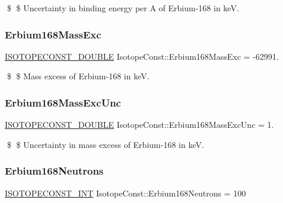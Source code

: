 \$ \$ Uncertainty in binding energy per A of Erbium-\/168 in keV. \mbox{\label{group___isotope_const-_erbium-_er168_gabd1a58198f4ecb49cb18844de8701a07}} 
\subsubsection{\texorpdfstring{Erbium168\+Mass\+Exc}{Erbium168MassExc}}
{\footnotesize\ttfamily \mbox{\hyperlink{group___isotope_const-_macros_ga8f45a7272ce02c0b4c65c44636ed719a}{I\+S\+O\+T\+O\+P\+E\+C\+O\+N\+S\+T\+\_\+\+D\+O\+U\+B\+LE}} Isotope\+Const\+::\+Erbium168\+Mass\+Exc = -\/62991.}

\$ \$ Mass excess of Erbium-\/168 in keV. \mbox{\label{group___isotope_const-_erbium-_er168_ga54f88c764cec3b32b38125db8c7d9d4e}} 
\subsubsection{\texorpdfstring{Erbium168\+Mass\+Exc\+Unc}{Erbium168MassExcUnc}}
{\footnotesize\ttfamily \mbox{\hyperlink{group___isotope_const-_macros_ga8f45a7272ce02c0b4c65c44636ed719a}{I\+S\+O\+T\+O\+P\+E\+C\+O\+N\+S\+T\+\_\+\+D\+O\+U\+B\+LE}} Isotope\+Const\+::\+Erbium168\+Mass\+Exc\+Unc = 1.}

\$ \$ Uncertainty in mass excess of Erbium-\/168 in keV. \mbox{\label{group___isotope_const-_erbium-_er168_ga1fe7f6a7ffdaa068e3ec6377a26f6599}} 
\subsubsection{\texorpdfstring{Erbium168\+Neutrons}{Erbium168Neutrons}}
{\footnotesize\ttfamily \mbox{\hyperlink{group___isotope_const-_macros_ga5f18360b3e99483a35c32d789e62621c}{I\+S\+O\+T\+O\+P\+E\+C\+O\+N\+S\+T\+\_\+\+I\+NT}} Isotope\+Const\+::\+Erbium168\+Neutrons = 100}

